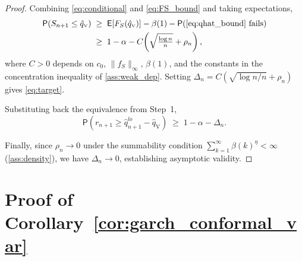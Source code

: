 \documentclass[11pt]{article}
\newcommand{\E}{\mathsf{E}}
\renewcommand{\P}{\mathsf{P}}
\newcommand{\qV}{\hat{q}_{\scriptscriptstyle\mathrm{V}}}
\begin{document}
\begin{proof}
Combining \eqref{eq:conditional} and \eqref{eq:FS_bound} and
taking expectations,
\begin{align*}
\P(S_{n+1}\le \qV)
&\;\ge\; \E[F_S(\qV)] - \beta(1)
- \P(\text{\eqref{eq:qhat_bound} fails}) \\
&\;\ge\; 1-\alpha
- C\!\left(\sqrt{\tfrac{\log n}{n}}+\rho_n\right),
\end{align*}
where $C>0$ depends on $c_0$, $\|f_S\|_\infty$, $\beta(1)$, and
the constants in the concentration inequality of
\ref{ass:weak_dep}. Setting
$\Delta_n = C(\sqrt{\log n / n}+\rho_n)$ gives \eqref{eq:target}.

Substituting back the equivalence from Step~1,
\[
\P\!\left(r_{n+1} \ge \hat q_{n+1}^{lo}-\qV\right)
\;\ge\; 1-\alpha-\Delta_n.
\]

Finally, since $\rho_n\to 0$ under the summability condition
$\sum_{k=1}^\infty \beta(k)^\eta<\infty$ (\ref{ass:density}), we
have $\Delta_n\to 0$, establishing asymptotic validity.
\end{proof}

\section{Proof of Corollary~\ref{cor:garch_conformal_var}}
\end{document}
